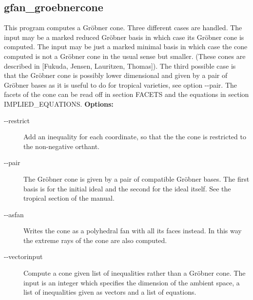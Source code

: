 {{{{{{{{{{{{\subsection{gfan\_groebnercone}\label{applist:_groebnercone}
This program computes a Gr\"obner cone. Three different cases are handled. The input may be a marked reduced Gr\"obner basis in which case its Gr\"obner cone is computed. The input may be just a marked minimal basis in which case the cone computed is not a Gr\"obner cone in the usual sense but smaller. (These cones are described in [Fukuda, Jensen, Lauritzen, Thomas]). The third possible case is that the Gr\"obner cone is possibly lower dimensional and given by a pair of Gr\"obner bases as it is useful to do for tropical varieties, see option -\hspace{0.013cm}-pair. The facets of the cone can be read off in section FACETS and the equations in section IMPLIED\_EQUATIONS.
\newline
{\bf Options:}
\begin{description}
\item[-\hspace{0.013cm}-restrict]Add an inequality for each coordinate, so that the the cone is restricted to the non-negative orthant.\item[-\hspace{0.013cm}-pair]The Gr\"obner cone is given by a pair of compatible Gr\"obner bases. The first basis is for the initial ideal and the second for the ideal itself. See the tropical section of the manual.\item[-\hspace{0.013cm}-asfan]Writes the cone as a polyhedral fan with all its faces instead. In this way the extreme rays of the cone are also computed.\item[-\hspace{0.013cm}-vectorinput]Compute a cone given list of inequalities rather than a Gr\"obner cone. The input is an integer which specifies the dimension of the ambient space, a list of inequalities given as vectors and a list of equations.\end{description}


}}}}}}}}}}}}
